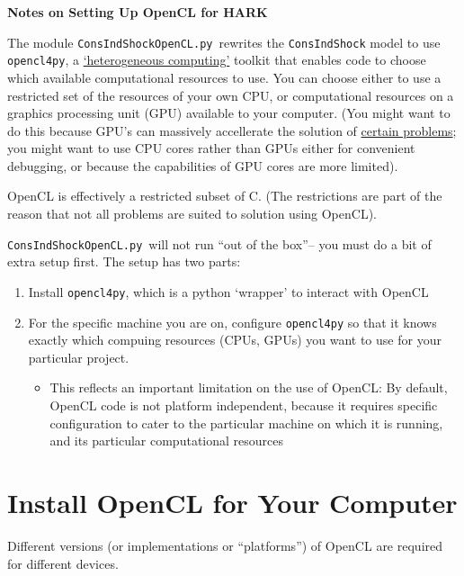 \documentclass[12pt,pdftex,letterpaper]{article}
\begin{document}
\centerline{\LARGE \bf Notes on Setting Up OpenCL for HARK} \medskip\medskip



\newcommand{\CISOCL}{\texttt{ConsIndShockOpenCL.py}~}
\newcommand{\oclpy}{\texttt{opencl4py}}
  
The module \CISOCL rewrites the \texttt{ConsIndShock} model to use \oclpy, a \href{https://en.wikipedia.org/wiki/Heterogeneous_computing}{`heterogeneous computing'} toolkit that enables code to choose which available computational resources to use.  You can choose either to use a restricted set of the resources of your own CPU, or computational resources on a graphics processing unit (GPU) available to your computer.  (You might want to do this because GPU's can massively accellerate the solution of \href{https://scicomp.stackexchange.com/questions/943/what-kinds-of-problems-lend-themselves-well-to-gpu-computing}{certain problems}; you might want to use CPU cores rather than GPUs either for convenient debugging, or because the capabilities of GPU cores are more limited).  

OpenCL is effectively a restricted subset of C.  (The restrictions are part of the reason that not all problems are suited to solution using OpenCL).

\CISOCL will not run ``out of the box''-- you must do a bit of extra setup first.  The setup has two parts:
\begin{enumerate}
\item Install {\oclpy}, which is a python `wrapper' to interact with OpenCL
\item For the specific machine you are on, configure {\oclpy} so that it knows exactly which compuing resources (CPUs, GPUs) you want to use for your particular project. 
  \begin{itemize}
  \item This reflects an important limitation on the use of OpenCL:  By default, OpenCL code is not platform independent, because it requires specific configuration to cater to the particular machine on which it is running, and its particular computational resources
  \end{itemize}
\end{enumerate}

\section{Install OpenCL for Your Computer}
Different versions (or implementations or ``platforms'') of OpenCL are required for different devices.
\end{document}
